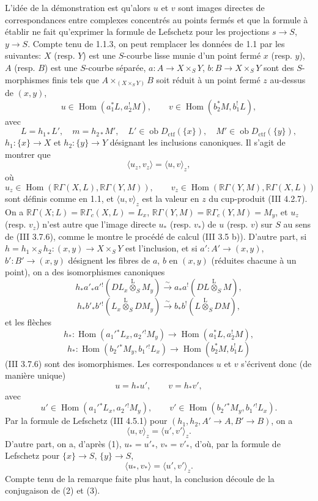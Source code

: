 \documentclass[11pt]{article}
\DeclareMathOperator{\Hom}{Hom}
\newcommand{\R}{\mathbb{R}}\newcommand{\RHomCore}{\mathbb{R}\mathrm{Hom}}
\providecommand{\lten}{\overset{\mathrm L}{\otimes}}
\providecommand{\Ob}{\operatorname{ob}}
\providecommand{\Hom}{\operatorname{Hom}}
\providecommand{\lten}{\overset{\mathrm L}{\otimes}}
\providecommand{\lten}{\overset{\mathrm L}{\otimes}}
\providecommand{\Ob}{\operatorname{ob}}
\providecommand{\R}{\mathrm R}
\providecommand{\lten}{\overset{\mathrm L}{\otimes}}
\providecommand{\lten}{\overset{\mathrm L}{\otimes}}
\providecommand{\Ob}{\operatorname{Ob}}
\providecommand{\lten}{\overset{\mathrm L}{\otimes}}
\providecommand{\Hom}{\operatorname{Hom}}
\providecommand{\Ob}{\operatorname{ob}}
\providecommand{\Ob}{\operatorname{Ob}}
\providecommand{\lten}{\overset{\mathrm L}{\otimes}}
\begin{document}
L'idée de la démonstration est qu'alors $u$ et $v$ sont images directes de correspondances entre complexes concentrés au points fermés et que la formule à établir ne fait qu'exprimer la formule de Lefschetz pour les projections $s\to S$, $y\to S$. Compte tenu de 1.1.3, on peut remplacer les données de 1.1 par les suivantes: $X$ (resp. $Y$) est une $S$-courbe lisse munie d'un point fermé $x$ (resp. $y$), $A$ (resp. $B$) est une $S$-courbe séparée, $a:A\to X\times_S Y$, $b:B\to X\times_S Y$ sont des $S$-morphismes finis tels que $A\times_{(X\times_SY)}B$ soit réduit à un point fermé $z$ au-dessus de $(x,y)$,
\[
u\in\Hom(a_1^*L,a_2^!M),\qquad v\in\Hom(b_2^*M,b_1^!L),
\]
avec
\[
L=h_{1*}L',\quad m=h_{2*}M',\quad
L'\in\Ob D_{\mathrm{ctf}}(\{x\}),\quad M'\in\Ob D_{\mathrm{ctf}}(\{y\}),
\]
$h_1:\{x\}\to X$ et $h_2:\{y\}\to Y$
désignant les inclusions canoniques. Il s'agit de montrer que
\[
\langle u_z,v_z\rangle=\langle u,v\rangle_z,
\]
où
\[
u_z\in\Hom(\R\Gamma(X,L),\R\Gamma(Y,M)),\qquad
v_z\in\Hom(\R\Gamma(Y,M),\R\Gamma(X,L))
\]
sont définis comme en 1.1, et $\langle u,v\rangle_z$ est la valeur en $z$ du cup-produit (III 4.2.7). On a $\R\Gamma(X;L)=\R\Gamma_c(X,L)=L_x$, $\R\Gamma(Y,M)=\R\Gamma_c(Y,M)=M_y$, et $u_z$ (resp. $v_z$) n'est autre que l'image directe $u_*$ (resp. $v_*$) de $u$ (resp. $v$) sur $S$ au sens de (III 3.7.6), comme le montre le procédé de calcul (III 3.5 b)). D'autre part, si $h=h_1\times_Sh_2:(x,y)\to X\times_SY$ est l'inclusion, et si $a':A'\to(x,y)$, $b':B'\to(x,y)$ désignent les fibres de $a$, $b$ en $(x,y)$ (réduites chacune à un point), on a des isomorphismes canoniques
\[
h_*a'_*a'{}^!(DL_x\lten_SM_y)
 \xrightarrow{\sim} a_*a^!(DL\lten_SM),
\]
\[
h_*b'_*b'{}^!(L_x\lten_SDM_y)
 \xrightarrow{\sim} b_*b^!(L\lten_SDM),
\]
et les flèches
\[
h_*:\Hom(a_1'{}^*L_x,a_2'{}^!M_y)\to \Hom(a_1^*L,a_2^!M),
\]
\[
h_*:\Hom(b_2'{}^*M_y,b_1'{}^!L_x)\to \Hom(b_2^*M,b_1^!L)
\]
(III 3.7.6) sont des isomorphismes. Les correspondances $u$ et $v$ s'écrivent donc (de manière unique)
\begin{equation}\tag{1}
u=h_*u',\qquad v=h_*v',
\end{equation}
avec
\[
u'\in\Hom(a_1'{}^*L_x,a_2'{}^!M_y),\qquad
v'\in\Hom(b_2'{}^*M_y,b_1'{}^!L_x).
\]
Par la formule de Lefschetz (III 4.5.1) pour $(h_1,h_2,A'\to A,B'\to B)$, on a
\begin{equation}\tag{2}
\langle u,v\rangle_z=\langle u',v'\rangle_z .
\end{equation}
D'autre part, on a, d'après (1), $u_*=u'_*$, $v_*=v'_*$, d'où, par la formule de Lefschetz pour $\{x\}\to S$, $\{y\}\to S$,
\begin{equation}\tag{3}
\langle u_*,v_*\rangle=\langle u',v'\rangle_z .
\end{equation}
Compte tenu de la remarque faite plus haut, la conclusion découle de la conjugaison de (2) et (3).
\end{document}

